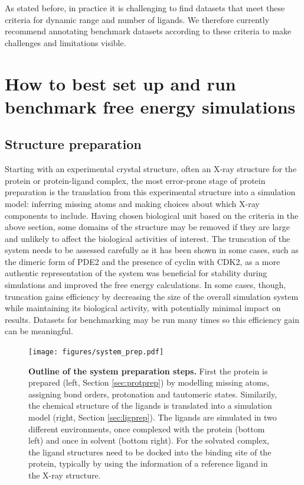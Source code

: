 \documentclass[9pt,bestpractices,pubversion]{livecoms}
\begin{document}
As stated before, in practice it is challenging to find datasets that meet these criteria for dynamic range and number of ligands. We therefore currently recommend annotating benchmark datasets according to these criteria to make challenges and limitations visible.

\section{How to best set up and run benchmark free energy simulations}
\label{sec:setup}

\subsection{Structure preparation}
\label{sec:prep}

Starting with an experimental crystal structure, often an X-ray structure for the protein or protein-ligand complex, the most error-prone stage of protein preparation is the translation from this experimental structure into a simulation model: inferring missing atoms and making choices about which X-ray components to include. Having chosen biological unit based on the criteria in the above section, some domains of the structure may be removed if they are large and unlikely to affect the biological activities of interest. The truncation of the system needs to be assessed carefully as it has been shown in some cases, such as the dimeric form of PDE2 and the presence of cyclin with CDK2, as a more authentic representation of the system was beneficial for stability during simulations and improved the free energy calculations. In some cases, though, truncation gains efficiency by decreasing the size of the overall simulation system while maintaining its biological activity, with potentially minimal impact on results. Datasets for benchmarking may be run many times so this efficiency gain can be meaningful. 

\begin{figure}[!ht]
    \centering
    \texttt{[image: figures/system\_prep.pdf]}
    \caption{\textbf{Outline of the system preparation steps.} 
    First the protein is prepared (left, Section \ref{sec:protprep}) by modelling missing atoms, assigning bond orders, protonation and tautomeric states. 
    Similarily, the chemical structure of the ligands is translated into a simulation model (right, Section \ref{sec:ligprep}). 
    The ligands are simulated in two different environments, once complexed with the protein (bottom left) and once in solvent (bottom right). 
    For the solvated complex, the ligand structures need to be docked into the binding site of the protein, typically by using the information of a reference ligand in the X-ray structure.
    }
    \label{fig:system_preparation}
\end{figure}
\end{document}
